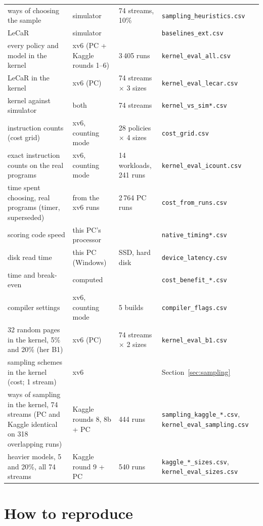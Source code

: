 \documentclass[10.5pt,a4paper]{article}
\newcommand{\code}[1]{\texttt{#1}}
\begin{document}
\begin{center}
\begin{tabular}{p{5.3cm}p{2.1cm}p{3.4cm}p{4.2cm}}
ways of choosing the sample & simulator & 74 streams, 10\% & \code{sampling\_heuristics.csv} \\
LeCaR & simulator & & \code{baselines\_ext.csv} \\
every policy and model in the kernel & xv6 (PC + Kaggle rounds 1--6) & 3\,405 runs & \code{kernel\_eval\_all.csv} \\
LeCaR in the kernel & xv6 (PC) & 74 streams $\times$ 3 sizes & \code{kernel\_eval\_lecar.csv} \\
kernel against simulator & both & 74 streams & \code{kernel\_vs\_sim*.csv} \\
instruction counts (cost grid) & xv6, counting mode & 28 policies $\times$ 4 sizes & \code{cost\_grid.csv} \\
exact instruction counts on the real programs & xv6, counting mode & 14 workloads, 241 runs & \code{kernel\_eval\_icount.csv} \\
time spent choosing, real programs (timer, superseded) & from the xv6 runs & 2\,764 PC runs & \code{cost\_from\_runs.csv} \\
scoring code speed & this PC's processor & & \code{native\_timing*.csv} \\
disk read time & this PC (Windows) & SSD, hard disk & \code{device\_latency.csv} \\
time and break-even & computed & & \code{cost\_benefit\_*.csv} \\
compiler settings & xv6, counting mode & 5 builds & \code{compiler\_flags.csv} \\
32 random pages in the kernel, 5\% and 20\% (her B1) & xv6 (PC) & 74 streams $\times$ 2 sizes & \code{kernel\_eval\_b1.csv} \\
sampling schemes in the kernel (cost; 1 stream) & xv6 & & Section~\ref{sec:sampling} \\
ways of sampling in the kernel, 74 streams (PC and Kaggle identical on 318 overlapping runs) & Kaggle rounds 8, 8b + PC & 444 runs & \code{sampling\_kaggle\_*.csv}, \code{kernel\_eval\_sampling.csv} \\
heavier models, 5 and 20\%, all 74 streams & Kaggle round 9 + PC & 540 runs & \code{kaggle\_*\_sizes.csv}, \code{kernel\_eval\_sizes.csv} \\
\bottomrule
\end{tabular}
\end{center}

\section{How to reproduce}
\label{app:repro}
\end{document}
